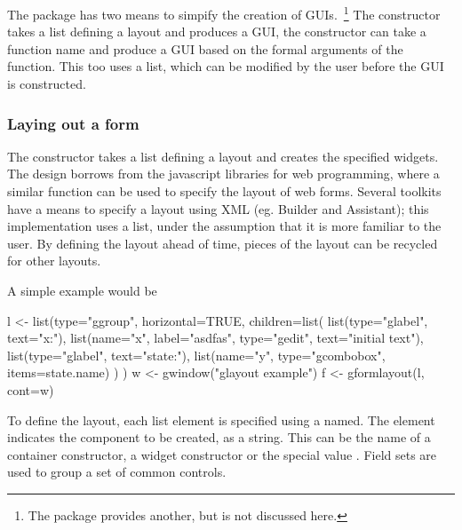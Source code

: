 The  package has two means to simpify the creation of
GUIs.~\footnote{The  package provides another, but is not
  discussed here.} The  constructor takes a list defining a
layout and produces a GUI, the  constructor can
take a function name and produce a GUI based on the formal arguments
of the function. This too uses a list, which can be modified by the
user before the GUI is constructed. 

\subsubsection{Laying out a form}
\label{sec:gWidgets-laying-out-form}



The  constructor takes a list defining a
layout and creates the specified widgets. The design borrows from the
 javascript libraries for web programming, where a similar
function can be used to specify the layout of web forms. Several
toolkits have a means to specify a layout using XML (eg. \GTK{}
Builder and \Qt{} Assistant); this implementation uses a list, under
the assumption that it is more familiar to the \R\/ user. By defining
the layout ahead of time, pieces of the layout can be recycled for
other layouts.

A simple example would be
\begin{Schunk}
\begin{Sinput}
 l <- list(type="ggroup",
           horizontal=TRUE,
           children=list(
             list(type="glabel",
                  text="x:"),
             list(name="x",
                  label="asdfas",
                  type="gedit",
                  text="initial text"),
             list(type="glabel",
                  text="state:"),
             list(name="y",
                  type="gcombobox",
                  items=state.name)
             )
           )
 w <- gwindow("glayout example")
 f <- gformlayout(l, cont=w)
\end{Sinput}
\end{Schunk}


To define the layout, each list element is specified using a 
named. The  element indicates the component
to be created, as a string. This can be the name of a container
constructor, a widget constructor or the special value
. Field sets are used to group a set of common
controls. 

